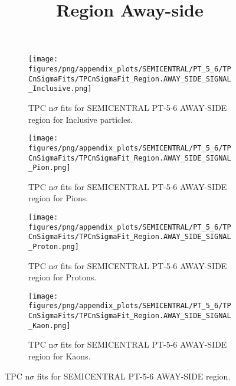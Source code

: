             \begin{figure}[H]
                \title{Region Away-side}
                \begin{subfigure}[b]{0.5\textwidth}
                    \centering
                    \texttt{[image: figures/png/appendix\_plots/SEMICENTRAL/PT\_5\_6/TPCnSigmaFits/TPCnSigmaFit\_Region.AWAY\_SIDE\_SIGNAL\_Inclusive.png]}
                    \caption{TPC n$\sigma$ fits for SEMICENTRAL PT-5-6 AWAY-SIDE region for Inclusive particles.}
                    \label{fig:appendix_SEMICENTRAL_PT-5-6_AWAY_SIDE_SIGNAL_Inclusive}
                \end{subfigure}
                \begin{subfigure}[b]{0.5\textwidth}
                    \centering
                    \texttt{[image: figures/png/appendix\_plots/SEMICENTRAL/PT\_5\_6/TPCnSigmaFits/TPCnSigmaFit\_Region.AWAY\_SIDE\_SIGNAL\_Pion.png]}
                    \caption{TPC n$\sigma$ fits for SEMICENTRAL PT-5-6 AWAY-SIDE region for Pions.}
                    \label{fig:appendix_SEMICENTRAL_PT-5-6_AWAY_SIDE_SIGNAL_Pion}
                \end{subfigure}
                \begin{subfigure}[b]{0.5\textwidth}
                    \centering
                    \texttt{[image: figures/png/appendix\_plots/SEMICENTRAL/PT\_5\_6/TPCnSigmaFits/TPCnSigmaFit\_Region.AWAY\_SIDE\_SIGNAL\_Proton.png]}
                    \caption{TPC n$\sigma$ fits for SEMICENTRAL PT-5-6 AWAY-SIDE region for Protons.}
                    \label{fig:appendix_SEMICENTRAL_PT-5-6_AWAY_SIDE_SIGNAL_Proton}
                \end{subfigure}
                \begin{subfigure}[b]{0.5\textwidth}
                    \centering
                    \texttt{[image: figures/png/appendix\_plots/SEMICENTRAL/PT\_5\_6/TPCnSigmaFits/TPCnSigmaFit\_Region.AWAY\_SIDE\_SIGNAL\_Kaon.png]}
                    \caption{TPC n$\sigma$ fits for SEMICENTRAL PT-5-6 AWAY-SIDE region for Kaons.}
                    \label{fig:appendix_SEMICENTRAL_PT-5-6_AWAY_SIDE_SIGNAL_Kaon}
                \end{subfigure}
                \caption{TPC n$\sigma$ fits for SEMICENTRAL PT-5-6 AWAY-SIDE region.}
                \label{fig:appendix_SEMICENTRAL_PT-5-6_AWAY_SIDE_SIGNAL}
            \end{figure}
